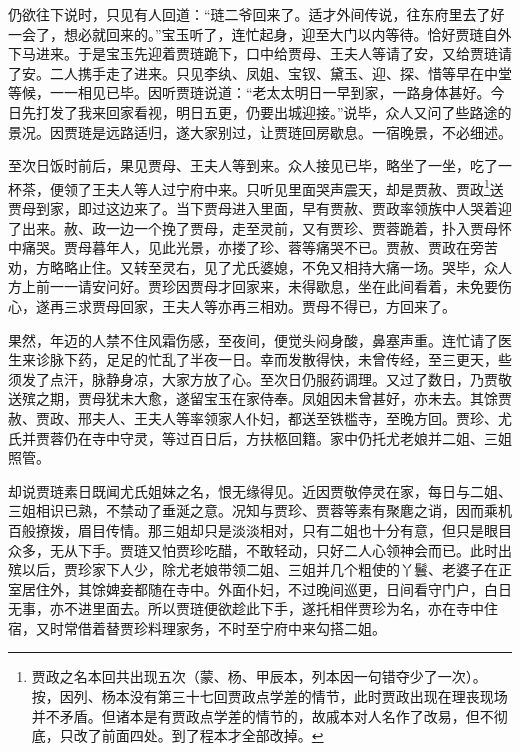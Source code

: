 仍欲往下说时，只见有人回道：“琏二爷回来了。适才外间传说，往东府里去了好一会了，想必就回来的。”宝玉听了，连忙起身，迎至大门以内等待。恰好贾琏自外下马进来。于是宝玉先迎着贾琏跪下，口中给贾母、王夫人等请了安，又给贾琏请了安。二人携手走了进来。只见李纨、凤姐、宝钗、黛玉、迎、探、惜等早在中堂等候，一一相见已毕。因听贾琏说道：“老太太明日一早到家，一路身体甚好。今日先打发了我来回家看视，明日五更，仍要出城迎接。”说毕，众人又问了些路途的景况。因贾琏是远路适归，遂大家别过，让贾琏回房歇息。一宿晚景，不必细述。

至次日饭时前后，果见贾母、王夫人等到来。众人接见已毕，略坐了一坐，吃了一杯茶，便领了王夫人等人过宁府中来。只听见里面哭声震天，却是贾赦、贾政\footnote{贾政之名本回共出现五次（蒙、杨、甲辰本，列本因一句错夺少了一次）。按，因列、杨本没有第三十七回贾政点学差的情节，此时贾政出现在理丧现场并不矛盾。但诸本是有贾政点学差的情节的，故戚本对人名作了改易，但不彻底，只改了前面四处。到了程本才全部改掉。}送贾母到家，即过这边来了。当下贾母进入里面，早有贾赦、贾政率领族中人哭着迎了出来。赦、政一边一个挽了贾母，走至灵前，又有贾珍、贾蓉跪着，扑入贾母怀中痛哭。贾母暮年人，见此光景，亦搂了珍、蓉等痛哭不已。贾赦、贾政在旁苦劝，方略略止住。又转至灵右，见了尤氏婆媳，不免又相持大痛一场。哭毕，众人方上前一一请安问好。贾珍因贾母才回家来，未得歇息，坐在此间看着，未免要伤心，遂再三求贾母回家，王夫人等亦再三相劝。贾母不得已，方回来了。

果然，年迈的人禁不住风霜伤感，至夜间，便觉头闷身酸，鼻塞声重。连忙请了医生来诊脉下药，足足的忙乱了半夜一日。幸而发散得快，未曾传经，至三更天，些须发了点汗，脉静身凉，大家方放了心。至次日仍服药调理。又过了数日，乃贾敬送殡之期，贾母犹未大愈，遂留宝玉在家侍奉。凤姐因未曾甚好，亦未去。其馀贾赦、贾政、邢夫人、王夫人等率领家人仆妇，都送至铁槛寺，至晚方回。贾珍、尤氏并贾蓉仍在寺中守灵，等过百日后，方扶柩回籍。家中仍托尤老娘并二姐、三姐照管。

却说贾琏素日既闻尤氏姐妹之名，恨无缘得见。近因贾敬停灵在家，每日与二姐、三姐相识已熟，不禁动了垂涎之意。况知与贾珍、贾蓉等素有聚麀之诮，因而乘机百般撩拨，眉目传情。那三姐却只是淡淡相对，只有二姐也十分有意，但只是眼目众多，无从下手。贾琏又怕贾珍吃醋，不敢轻动，只好二人心领神会而已。此时出殡以后，贾珍家下人少，除尤老娘带领二姐、三姐并几个粗使的丫鬟、老婆子在正室居住外，其馀婢妾都随在寺中。外面仆妇，不过晚间巡更，日间看守门户，白日无事，亦不进里面去。所以贾琏便欲趁此下手，遂托相伴贾珍为名，亦在寺中住宿，又时常借着替贾珍料理家务，不时至宁府中来勾搭二姐。

